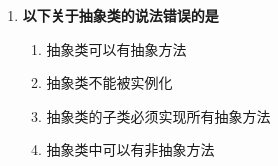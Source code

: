 \documentclass[12pt, a4paper]{ctexart}
\begin{document}
\begin{enumerate}[label=\textbf{\arabic*.}]
\begin{bluebox}{答案与深度解析}
		      \textbf{【选项原理深度拆解】}
		      \begin{itemize}[label={}, nosep]
			      \item \textbf{A. extends — 正确（类继承关键字）}
			      \begin{itemize}[label={}, nosep]
				      \item JLS §8.1：使用extends关键字实现类继承
				      \item 子类自动获得父类的非私有成员
				      \item 单继承：一个类只能继承一个父类
			      \end{itemize}
			      \item \textbf{B. implements — 错误（用于接口实现）}
			      \begin{itemize}[label={}, nosep]
				      \item implements用于实现接口
			      \end{itemize}
			      \item \textbf{C. interface — 错误（用于定义接口）}
			      \begin{itemize}[label={}, nosep]
				      \item interface用于定义接口
			      \end{itemize}
			      \item \textbf{D. abstract — 错误（用于定义抽象类/方法）}
			      \begin{itemize}[label={}, nosep]
				      \item abstract用于定义抽象类或抽象方法
			      \end{itemize}
		      \end{itemize}

		      \textbf{【应背诵知识点>}
		      \begin{itemize}[label={}, nosep]
			      \item 类继承：extends（单继承）
			      \item 接口实现：implements（多实现）
			      \item 接口继承：extends（多继承）
		      \end{itemize}
	      \end{bluebox}

	      \vspace{1em}

	\item \textbf{以下关于抽象类的说法错误的是}
	      \begin{enumerate}[label=\Alph*.]
		      \item 抽象类可以有抽象方法
		      \item 抽象类不能被实例化
		      \item 抽象类的子类必须实现所有抽象方法
		      \item 抽象类中可以有非抽象方法
	      \end{enumerate}


\end{enumerate}
\end{document}

